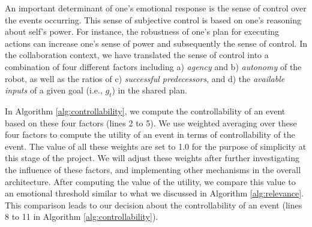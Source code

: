 \documentclass{aamas2016}
\begin{document}
An important determinant of one's emotional response is the sense of control
over the events occurring. This sense of subjective control is based on one's
reasoning about self's power. For instance, the robustness of one's plan for
executing actions can increase one's sense of power and subsequently the sense
of control. In the collaboration context, we have translated the sense of control
into a combination of four different factors including a) \textit{agency} and b)
\textit{autonomy} of the robot, as well as the ratios of c) \textit{successful
predecessors}, and d) the \textit{available inputs} of a given goal
(i.e., $\mathit{g}_{t}$) in the shared plan.

In Algorithm \ref{alg:controllability}, we compute the controllability of an
event based on these four factors (lines 2 to 5). We use weighted averaging over
these four factors to compute the utility of an event in terms of
controllability of the event. The value of all these weights are set to 1.0 for
the purpose of simplicity at this stage of the project. We will adjust these
weights after further investigating the influence of these factors, and
implementing other mechanisms in the overall architecture. After computing the
value of the utility, we compare this value to an emotional threshold similar to
what we discussed in Algorithm \ref{alg:relevance}. This comparison leads to our
decision about the controllability of an event (lines 8 to 11 in Algorithm
\ref{alg:controllability}).

% 
\end{document}
